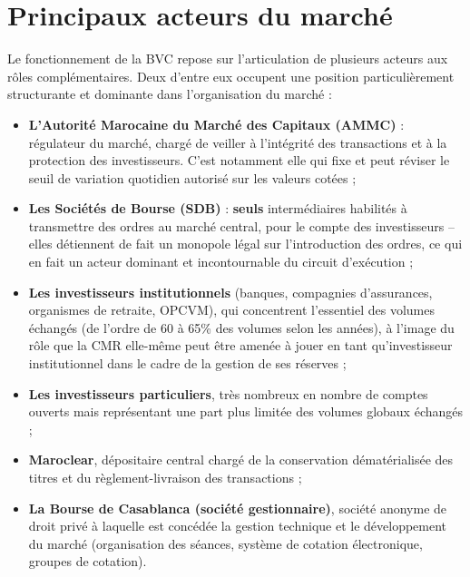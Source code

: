 \documentclass{rapportENSIAS} %
\begin{document}
\section{Principaux acteurs du marché}

\noindent
Le fonctionnement de la BVC repose sur l'articulation de plusieurs acteurs aux rôles complémentaires. Deux d'entre eux occupent une position particulièrement structurante et dominante dans l'organisation du marché :

\begin{itemize}
    \item \textbf{L'Autorité Marocaine du Marché des Capitaux (AMMC)} : régulateur du marché, chargé de veiller à l'intégrité des transactions et à la protection des investisseurs. C'est notamment elle qui fixe et peut réviser le seuil de variation quotidien autorisé sur les valeurs cotées ;
    \item \textbf{Les Sociétés de Bourse (SDB)} : \textbf{seuls} intermédiaires habilités à transmettre des ordres au marché central, pour le compte des investisseurs -- elles détiennent de fait un monopole légal sur l'introduction des ordres, ce qui en fait un acteur dominant et incontournable du circuit d'exécution ;
    \item \textbf{Les investisseurs institutionnels} (banques, compagnies d'assurances, organismes de retraite, OPCVM), qui concentrent l'essentiel des volumes échangés (de l'ordre de 60 à 65\% des volumes selon les années), à l'image du rôle que la CMR elle-même peut être amenée à jouer en tant qu'investisseur institutionnel dans le cadre de la gestion de ses réserves ;
    \item \textbf{Les investisseurs particuliers}, très nombreux en nombre de comptes ouverts mais représentant une part plus limitée des volumes globaux échangés ;
    \item \textbf{Maroclear}, dépositaire central chargé de la conservation dématérialisée des titres et du règlement-livraison des transactions ;
    \item \textbf{La Bourse de Casablanca (société gestionnaire)}, société anonyme de droit privé à laquelle est concédée la gestion technique et le développement du marché (organisation des séances, système de cotation électronique, groupes de cotation).
\end{itemize}

\noindent
\end{document}
